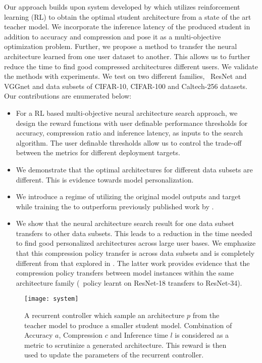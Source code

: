 \documentclass[../main]{subfiles}
\begin{document}
Our approach builds upon system developed by \citet{ashok2017n2n} which utilizes reinforcement learning (RL) to obtain the optimal student architecture from a state of the art teacher model.
We incorporate the inference latency of the produced student in addition to accuracy and compression and pose it as a multi-objective optimization problem.
Further, we propose a method to transfer the neural architecture learned from one user dataset to another.
This allows us to further reduce the time to find good compressed architectures \wrt{} different users.
We validate the methods with experiments.
We test on two different families, \viz~ResNet and VGGnet and \wrt{} data subsets of CIFAR-10, CIFAR-100 and Caltech-256 datasets.
Our contributions are enumerated below:
\begin{itemize}
	\item For a RL based multi-objective neural architecture search approach, we design the reward functions with user definable performance thresholds for accuracy, compression ratio and inference latency, as inputs to the search algorithm.
	The user definable thresholds allow us to control the trade-off between the metrics for different deployment targets.
	\item We demonstrate that the optimal architectures for different data subsets are different.
	This is evidence towards model personalization.
	\item We introduce a regime of utilizing the original model outputs and target while training the  to outperform previously published work by \citet{ashok2017n2n,hinton2015distilling}.
	\item We show that the neural architecture search result for one data subset transfers to other data subsets.
	This leads to a reduction in the time needed to find good personalized architectures across large user bases.
	We emphasize that this compression policy transfer is across data subsets and is completely different from that explored in \citet{ashok2017n2n}.
	The latter work provides evidence that the compression policy transfers between model instances within the same architecture family (\eg~policy learnt on ResNet-18 transfers to ResNet-34).
\end{itemize}

\begin{figure}
  \texttt{[image: system]}
  \caption{A recurrent controller which sample an architecture $p$ from the teacher model to produce a smaller student model.
  Combination of Accuracy $a$, Compression $c$ and Inference time $l$ is considered as a metric to scrutinize a generated architecture.
  This reward is then used to update the parameters of the recurrent controller.}
  \label{fig:boat1}
\end{figure}
\end{document}
